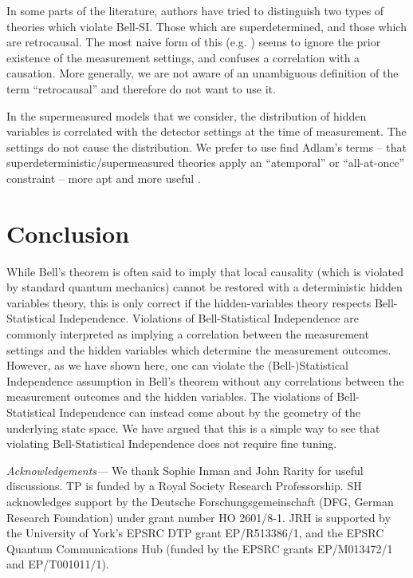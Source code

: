 \documentclass{article}
\begin{document}
In some parts of the literature, authors have tried to distinguish two types of theories which violate Bell-SI. Those which are superdetermined, and those which are retrocausal. The most naive form of this (e.g. \mbox{\cite{sen2022analysis}}) seems to ignore the prior existence of the measurement settings, and confuses a correlation with a causation. More generally, we are not aware of an unambiguous definition of the term ``retrocausal'' and therefore do not want to use it.

In the supermeasured models that we consider, the distribution of hidden variables is correlated with the detector settings at the time of measurement. The settings do not cause the distribution. We prefer to use  find Adlam's terms -- that superdeterministic/supermeasured theories apply an ``atemporal'' or ``all-at-once'' constraint -- more apt and more useful \mbox{\cite{adlam2022two}}.
 

\section{Conclusion}

While Bell's theorem is often said to imply that local causality (which is violated by standard quantum mechanics) cannot be restored with a deterministic hidden variables theory, this is only correct if the hidden-variables theory respects Bell-Statistical Independence. Violations of Bell-Statistical Independence are commonly interpreted as implying a correlation between the measurement settings and the hidden variables which determine the measurement outcomes. However, as we have shown here, one can violate the (Bell-)Statistical Independence assumption in Bell's theorem without any correlations between the measurement outcomes and the hidden variables. The violations of Bell-Statistical Independence can instead come about by the geometry of the underlying state space. We have argued that this is a simple way to see that violating Bell-Statistical Independence does not require fine tuning.

\bigskip

\textit{Acknowledgements---}
We thank Sophie Inman and John Rarity for useful discussions. TP is funded by a Royal Society Research Professorship. SH acknowledges support by the Deutsche Forschungsgemeinschaft (DFG, German Research Foundation) under grant number HO 2601/8-1. JRH is supported by the University of York's EPSRC DTP grant EP/R513386/1, and the EPSRC Quantum Communications Hub (funded by the EPSRC grants EP/M013472/1 and EP/T001011/1).



\end{document}
